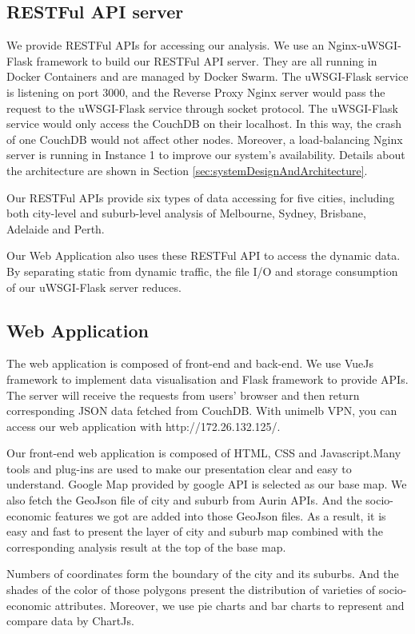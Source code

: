 \documentclass{article}
\begin{document}
\subsection{RESTFul API server}
We provide RESTFul APIs for accessing our analysis. We use an Nginx-uWSGI-Flask framework to build our RESTFul API server. They are all running in Docker Containers and are managed by Docker Swarm. The uWSGI-Flask service is listening on port 3000, and the Reverse Proxy Nginx server would pass the request to the uWSGI-Flask service through socket protocol. The uWSGI-Flask service would only access the CouchDB on their localhost. In this way, the crash of one CouchDB would not affect other nodes. Moreover, a load-balancing Nginx server is running in Instance 1 to improve our system's availability. Details about the architecture are shown in Section \ref{sec:systemDesignAndArchitecture}.

Our RESTFul APIs provide six types of data accessing for five cities, including both city-level and suburb-level analysis of Melbourne, Sydney, Brisbane, Adelaide and Perth. 

Our Web Application also uses these RESTFul API to access the dynamic data. By separating static from dynamic traffic, the file I/O and storage consumption of our uWSGI-Flask server reduces. 

\subsection{Web Application}
The web application is composed of front-end and back-end. We use VueJs framework to implement data visualisation and Flask framework to provide APIs. The server will receive the requests from users’ browser and then return corresponding JSON data fetched from CouchDB. With unimelb VPN, you can access our web application with http://172.26.132.125/.

Our front-end web application is composed of HTML, CSS and Javascript.Many tools and plug-ins are used to make our presentation clear and easy to understand. Google Map provided by google API is selected as our base map. We also fetch the GeoJson file of city and suburb from Aurin APIs. And the socio-economic features we got are added into those GeoJson files. As a result, it is easy and fast to present the layer of city and suburb map combined with the corresponding analysis result at the top of the base map.

Numbers of coordinates form the boundary of the city and its suburbs. And the shades of the color of those polygons present the distribution of varieties of socio-economic attributes. Moreover, we use pie charts and bar charts to represent and compare data by ChartJs.
\end{document}

